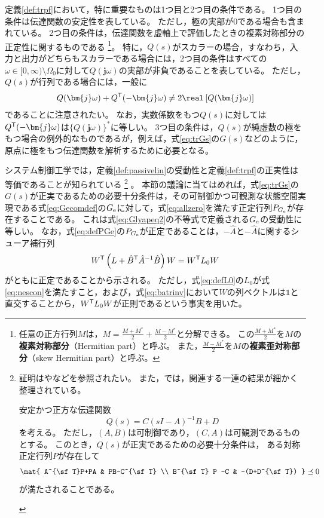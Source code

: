 \documentclass[tombow,dvipdfmx]{corona-a5-1.1}
\begin{document}
定義\ref{def:trpf}において，特に重要なものは1つ目と2つ目の条件である。
1つ目の条件は伝達関数の安定性を表している。
ただし，極の実部が0である場合も含まれている。
2つ目の条件は，伝達関数を虚軸上で評価したときの複素対称部分の正定性に関するものである
\footnote{
任意の正方行列$M$は，$M=\tfrac{M+M^*}{2}+\tfrac{M-M^*}{2}$と分解できる。
この$\tfrac{M+M^*}{2}$を$M$の\textbf{複素対称部分}（Hermitian part）と呼ぶ。
また，$\tfrac{M-M^*}{2}$を$M$の\textbf{複素歪対称部分}（skew Hermitian part）と呼ぶ。
}。
特に，$Q(s)$がスカラーの場合，すなわち，入力と出力がどちらもスカラーである場合には，2つ目の条件はすべての$\omega \in [0,\infty)\setminus \Omega_0$に対して$Q(\bm{j}\omega)$の実部が非負であることを表している。
ただし，$Q(s)$が行列である場合には，一般に
\begin{align*}
Q(\bm{j} \omega) + Q^{\sf T}(-\bm{j} \omega) \neq 2 \real\left[ Q(\bm{j} \omega) \right]
\end{align*}
であることに注意されたい。
なお，実数係数をもつ$Q(s)$に対しては$Q^{\sf T}( -\bm{j} \omega)$は$\{Q(\bm{j} \omega)\}^*$に等しい。
3つ目の条件は，$Q(s)$が純虚数の極をもつ場合の例外的なものであるが，例えば，式\ref{eq:trGs}の$G(s)$などのように，原点に極をもつ伝達関数を解析するために必要となる。


システム制御工学では，定義\ref{def:passivelin}の受動性と定義\ref{def:trpf}の正実性は等価であることが知られている
\footnote{
証明は\cite[Theorem 5.31]{antoulas2005approximation}や\cite[Theorem 3]{anderson1967system}などを参照されたい。
また，\cite{kottenstette2010relationships}では，関連する一連の結果が細かく整理されている。
\begin{補題*}
安定かつ正方な伝達関数
\[
Q(s)=C(sI-A)^{-1}B + D
\]
を考える。
ただし，$(A,B)$は可制御であり，$(C,A)$は可観測であるものとする。
このとき，$Q(s)$が正実であるための必要十分条件は，
ある対称正定行列$P$が存在して
\begin{align*}%
\mat{
A^{\sf T}P+PA & PB-C^{\sf T} \\
B^{\sf T} P -C & -(D+D^{\sf T})
}\preceq 0
\end{align*}
が満たされることである。
\end{補題*}
}
。
本節の議論に当てはめれば，式\ref{eq:trGs}の$G(s)$が正実であるための必要十分条件は，その可制御かつ可観測な状態空間実現である式\ref{eq:Gecomdef}の$G_{\rm e}$に対して，式\ref{eq:allzero}を満たす正定行列$P_{G_{\rm e}}$が存在することである。
これは式\ref{eq:Glyapeq2}の不等式で定義される$G_{\rm e}$の受動性に等しい。
なお，式\ref{eq:defPGe}の$P_{G_{\rm e}}$が正定であることは，$-\hat{A}$と$-\hat{A}$に関するシューア補行列
\[
W^{\sf T} \left(L+\hat{B}^{\sf T} \hat{A}^{-1} \hat{B} \right) W
=  W^{\sf T} L_0 W
\]
がともに正定であることから示される。
ただし，式\ref{eq:defL0}の$L_0$が式\ref{eq:nescon}を満たすこと，および，式\ref{eq:batrinv}において$W$の列ベクトルは$\mathds{1}$と直交することから，$W^{\sf T} L_0 W$が正則であるという事実を用いた。
\end{document}
